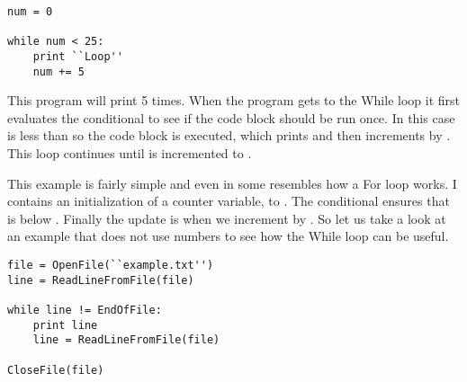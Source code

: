\begin{lstlisting}[caption={While Loop}]
num = 0

while num < 25:
    print ``Loop''
    num += 5
\end{lstlisting}

This program will print  5 times.
When the program gets to the While loop it first evaluates the conditional to see if the code block should be run once.
In this case  is less than  so the code block is executed, which prints  and then increments  by .
This loop continues until  is incremented to .
\par

This example is fairly simple and even in some resembles how a For loop works.
I contains an initialization of a counter variable,  to .
The conditional ensures that  is below .
Finally the update is when we increment  by .
So let us take a look at an example that does not use numbers to see how the While loop can be useful.

\begin{lstlisting}[caption={While Loop Over File}]
file = OpenFile(``example.txt'')
line = ReadLineFromFile(file)

while line != EndOfFile:
    print line
    line = ReadLineFromFile(file)

CloseFile(file)
\end{lstlisting}

